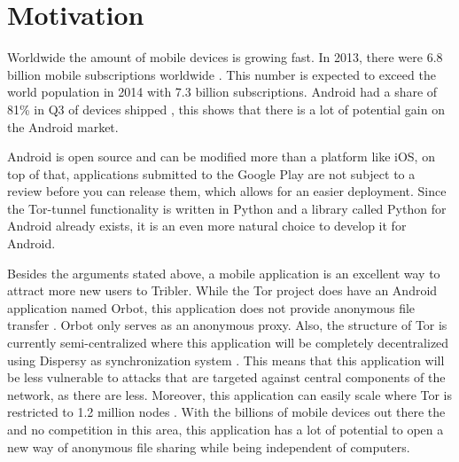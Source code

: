 \section{Motivation}
	Worldwide the amount of mobile devices is growing fast. In 2013, there were 6.8 billion mobile subscriptions worldwide \cite{itustatistics}. This number is expected to exceed the world population in 2014 with 7.3 billion subscriptions. Android had a share of 81\% in Q3 of devices shipped \cite{forbesandroidmarket}, this shows that there is a lot of potential gain on the Android market. 
	
	Android is open source and can be modified more than a platform like iOS, on top of that, applications submitted to the Google Play are not subject to a review before you can release them, which allows for an easier deployment. Since the Tor-tunnel functionality is written in Python and a library called Python for Android already exists, it is an even more natural choice to develop it for Android.

	Besides the arguments stated above, a mobile application is an excellent way to attract more new users to Tribler. While the Tor project does have an Android application named Orbot, this application does not provide anonymous file transfer \cite{tororbot, googleplayorbot}. Orbot only serves as an anonymous proxy. Also, the structure of Tor is currently semi-centralized \cite{jagerman2014fifteen} where this application will be completely decentralized using Dispersy as synchronization system \cite{zeilemaker2013dispersy}. This means that this application will be less vulnerable to attacks that are targeted against central components of the network, as there are less. Moreover, this application can easily scale where Tor is restricted to 1.2 million nodes \cite{mclachlan2009scalable}. With the billions of mobile devices out there the and no competition in this area, this application has a lot of potential to open a new way of anonymous file sharing while being independent of computers.
	
